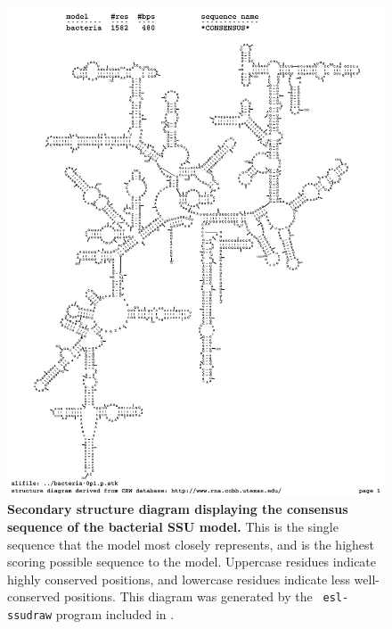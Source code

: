 \begin{figure}
\begin{center}
\includegraphics[width=5.5in]{../../seeds/ss-diagrams/bacteria-0p1-rf}
\end{center}
\caption[Secondary structure diagram displaying the consensus sequence
  of the bacterial SSU model]{\textbf{Secondary structure diagram displaying the
  consensus sequence of the bacterial SSU model.} 
  This is the single sequence that the model 
  most closely represents, and is the highest scoring possible
  sequence to the model. Uppercase residues indicate highly conserved positions,
  and lowercase residues indicate less well-conserved positions.
  This diagram was generated by the {\tt
  esl-ssudraw} program included in .}
\label{fig:bacrf}
\end{figure}

